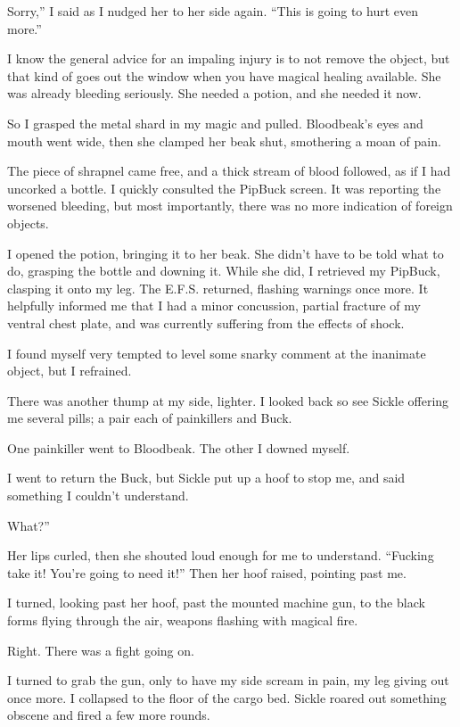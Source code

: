 \leavevmode{}Sorry,” I said as I nudged her to her side again. “This is going to hurt even more.”

I know the general advice for an impaling injury is to not remove the object, but that kind of goes out the window when you have magical healing available. She was already bleeding seriously. She needed a potion, and she needed it now.

So I grasped the metal shard in my magic and pulled. Bloodbeak’s eyes and mouth went wide, then she clamped her beak shut, smothering a moan of pain.

The piece of shrapnel came free, and a thick stream of blood followed, as if I had uncorked a bottle. I quickly consulted the PipBuck screen. It was reporting the worsened bleeding, but most importantly, there was no more indication of foreign objects.

I opened the potion, bringing it to her beak. She didn’t have to be told what to do, grasping the bottle and downing it. While she did, I retrieved my PipBuck, clasping it onto my leg. The E.F.S. returned, flashing warnings once more. It helpfully informed me that I had a minor concussion, partial fracture of my ventral chest plate, and was currently suffering from the effects of shock.

I found myself very tempted to level some snarky comment at the inanimate object, but I refrained.

There was another thump at my side, lighter. I looked back so see Sickle offering me several pills; a pair each of painkillers and Buck.

One painkiller went to Bloodbeak. The other I downed myself.

I went to return the Buck, but Sickle put up a hoof to stop me, and said something I couldn’t understand.

\leavevmode{}What?”

Her lips curled, then she shouted loud enough for me to understand. “Fucking take it! You’re going to need it!” Then her hoof raised, pointing past me.

I turned, looking past her hoof, past the mounted machine gun, to the black forms flying through the air, weapons flashing with magical fire.

Right. There was a fight going on.

I turned to grab the gun, only to have my side scream in pain, my leg giving out once more. I collapsed to the floor of the cargo bed. Sickle roared out something obscene and fired a few more rounds.

